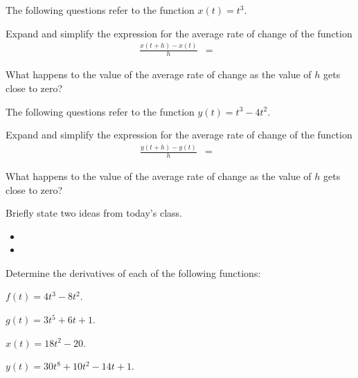 \begin{problem}
    \clearpage

  \item The following questions refer to the function $x(t)=t^3$.
    \begin{subproblem}
    \item Expand and simplify the expression for the average rate of
      change of the function
      \begin{eqnarray*}
        \frac{x(t+h)-x(t)}{h} & = & 
      \end{eqnarray*}
      \vspace{3em}
    \item What happens to the value of the average rate of change as
      the value of $h$ gets close to zero?
      \vspace{3em}
    \end{subproblem}

  \item The following questions refer to the function $y(t)=t^3-4t^2$.
    \begin{subproblem}
    \item Expand and simplify the expression for the average rate of
      change of the function
      \begin{eqnarray*}
        \frac{y(t+h)-y(t)}{h} & = & 
      \end{eqnarray*}
      \vspace{3em}
    \item What happens to the value of the average rate of change as
      the value of $h$ gets close to zero?
      \vspace{3em}
    \end{subproblem}


\end{problem}

\postClass

\begin{problem}
\item Briefly state two ideas from today's class.
  \begin{itemize}
  \item 
  \item 
  \end{itemize}
\item Determine the derivatives of each of the following functions:
  \begin{subproblem}
    \item $f(t)=4t^3-8t^2$.
      \vfill
    \item $g(t)=3t^5+6t + 1$.
      \vfill
    \item $x(t)=18t^2-20$.
      \vfill
    \item $y(t)=30t^8+10t^2 - 14 t + 1$.
      \vfill
  \end{subproblem}
\end{problem}



